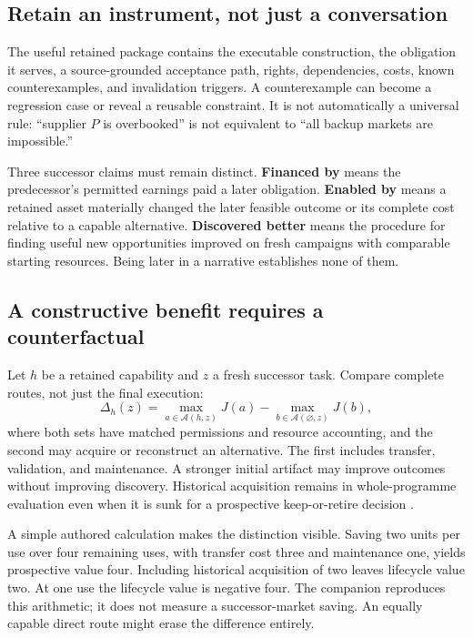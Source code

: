 \documentclass[11pt,a4paper]{article}
\newcommand{\term}[1]{\textbf{#1}}
\begin{document}
\subsection{Retain an instrument, not just a conversation}
The useful retained package contains the executable construction, the obligation it serves, a source-grounded acceptance path, rights, dependencies, costs, known counterexamples, and invalidation triggers. A counterexample can become a regression case or reveal a reusable constraint. It is not automatically a universal rule: ``supplier $P$ is overbooked'' is not equivalent to ``all backup markets are impossible.''

Three successor claims must remain distinct. \term{Financed by} means the predecessor's permitted earnings paid a later obligation. \term{Enabled by} means a retained asset materially changed the later feasible outcome or its complete cost relative to a capable alternative. \term{Discovered better} means the procedure for finding useful new opportunities improved on fresh campaigns with comparable starting resources. Being later in a narrative establishes none of them.

\subsection{A constructive benefit requires a counterfactual}
Let $h$ be a retained capability and $z$ a fresh successor task. Compare complete routes, not just the final execution:
\begin{equation}
\Delta_h(z)=\max_{a\in\mathcal A(h,z)}J(a)-\max_{b\in\mathcal A(\varnothing,z)}J(b),\label{eq:inherit}
\end{equation}
where both sets have matched permissions and resource accounting, and the second may acquire or reconstruct an alternative. The first includes transfer, validation, and maintenance. A stronger initial artifact may improve outcomes without improving discovery. Historical acquisition remains in whole-programme evaluation even when it is sunk for a prospective keep-or-retire decision \cite[Secs.~6.3, 12]{genesis}.

A simple authored calculation makes the distinction visible. Saving two units per use over four remaining uses, with transfer cost three and maintenance one, yields prospective value four. Including historical acquisition of two leaves lifecycle value two. At one use the lifecycle value is negative four. The companion reproduces this arithmetic; it does not measure a successor-market saving. An equally capable direct route might erase the difference entirely.
\end{document}
